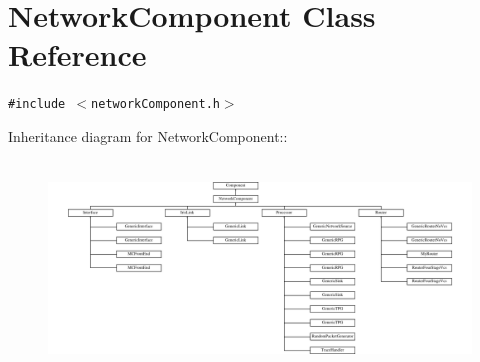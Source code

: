 \hypertarget{classNetworkComponent}{
\section{NetworkComponent Class Reference}
\label{classNetworkComponent}
}
{\tt \#include $<$networkComponent.h$>$}

Inheritance diagram for NetworkComponent::\begin{figure}[H]
\begin{center}
\leavevmode
\includegraphics[height=5.6875cm]{classNetworkComponent}
\end{center}
\end{figure}
